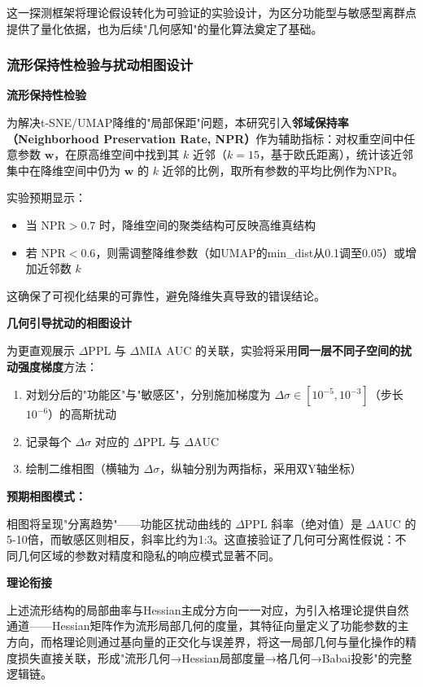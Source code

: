 \documentclass[letterpaper,twocolumn,10pt]{article}
\begin{document}
这一探测框架将理论假设转化为可验证的实验设计，为区分功能型与敏感型离群点提供了量化依据，也为后续"几何感知"的量化算法奠定了基础。

\subsubsection{流形保持性检验与扰动相图设计}

\textbf{流形保持性检验}

为解决t-SNE/UMAP降维的"局部保距"问题，本研究引入\textbf{邻域保持率（Neighborhood Preservation Rate, NPR）}作为辅助指标：对权重空间中任意参数 $\mathbf{w}$，在原高维空间中找到其 $k$ 近邻（$k=15$，基于欧氏距离），统计该近邻集中在降维空间中仍为 $\mathbf{w}$ 的 $k$ 近邻的比例，取所有参数的平均比例作为NPR。

实验预期显示：
\begin{itemize}
\item 当 $\text{NPR} > 0.7$ 时，降维空间的聚类结构可反映高维真结构
\item 若 $\text{NPR} < 0.6$，则需调整降维参数（如UMAP的min\_dist从0.1调至0.05）或增加近邻数 $k$
\end{itemize}

这确保了可视化结果的可靠性，避免降维失真导致的错误结论。

\textbf{几何引导扰动的相图设计}

为更直观展示 $\Delta \text{PPL}$ 与 $\Delta \text{MIA AUC}$ 的关联，实验将采用\textbf{同一层不同子空间的扰动强度梯度}方法：

\begin{enumerate}
\item 对划分后的"功能区"与"敏感区"，分别施加梯度为 $\Delta \sigma \in [10^{-5}, 10^{-3}]$（步长 $10^{-6}$）的高斯扰动
\item 记录每个 $\Delta \sigma$ 对应的 $\Delta \text{PPL}$ 与 $\Delta \text{AUC}$
\item 绘制二维相图（横轴为 $\Delta \sigma$，纵轴分别为两指标，采用双Y轴坐标）
\end{enumerate}

\textbf{预期相图模式：}

相图将呈现"分离趋势"——功能区扰动曲线的 $\Delta \text{PPL}$ 斜率（绝对值）是 $\Delta \text{AUC}$ 的5-10倍，而敏感区则相反，斜率比约为1:3。这直接验证了几何可分离性假说：不同几何区域的参数对精度和隐私的响应模式显著不同。

\textbf{理论衔接}

上述流形结构的局部曲率与Hessian主成分方向一一对应，为引入格理论提供自然通道——Hessian矩阵作为流形局部几何的度量，其特征向量定义了功能参数的主方向，而格理论则通过基向量的正交化与误差界，将这一局部几何与量化操作的精度损失直接关联，形成"流形几何→Hessian局部度量→格几何→Babai投影"的完整逻辑链。
\end{document}
